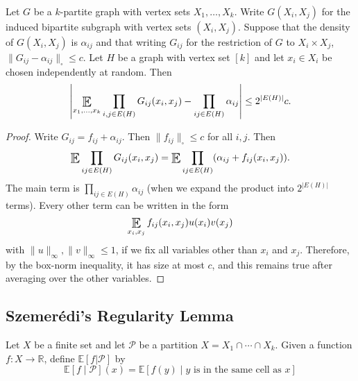 \documentclass{article}
\DeclareMathOperator*{\E}{\scalerel*{\mathbb{E}}{\textstyle\sum}}
\newcommand{\1}[1]{\mathbbm{1}_{#1}}
\begin{document}
\begin{nlemma}\label{lem:3.7}
  Let $G$ be a $k$-partite graph with vertex sets $X_1, \dotsc, X_k$.
  Write $G(X_i, X_j)$ for the induced bipartite subgraph with vertex sets $(X_i, X_j)$.
  Suppose that the density of $G(X_i, X_j)$ is $\alpha_{ij}$ and that writing $G_{ij}$ for the restriction of $G$ to $X_i \times X_j$, $\|G_{ij} - \alpha_{ij}\|_\square \leq c$.
  Let $H$ be a graph with vertex set $[k]$ and let $x_i \in X_i$ be chosen independently at random.
  Then
  \begin{equation*}
    \left\lvert\E_{x_1, \dotsc, x_k} \prod_{i,j \in E(H)} G_{ij}(x_i,x_j) - \prod_{ij \in E(H)} \alpha_{ij}\right\rvert \leq 2^{|E(H)|} c.
  \end{equation*}
\end{nlemma}
\begin{proof}
  Write $G_{ij} = f_{ij} + \alpha_{ij}$. Then $\|f_{ij}\|_\square \leq c$ for all $i,j$.
  Then
  \begin{equation*}
    \E \prod_{ij \in E(H)} G_{ij}(x_i,x_j) = \E \prod_{ij \in E(H)} (\alpha_{ij} + f_{ij}(x_i,x_j)).
  \end{equation*}
  The main term is $\prod_{ij \in E(H)} \alpha_{ij}$ (when we expand the product into $2^{|E(H)|}$ terms).
  Every other term can be written in the form
  \begin{equation*}
    \E_{x_i,x_j} f_{ij} (x_i,x_j) u(x_i) v(x_j)
  \end{equation*}
  with $\|u\|_\infty, \|v\|_\infty \leq 1$, if we fix all variables other than $x_i$ and $x_j$.
  Therefore, by the box-norm inequality, it has size at most $c$, and this remains true after averaging over the other variables.
\end{proof}

\subsection{Szemer\'edi's Regularity Lemma}
Let $X$ be a finite set and let $\mathcal{P}$ be a partition $X = X_1 \cap \dotsb \cap X_k$.
Given a function $f: X \to \mathbb{R}$, define $\mathbb{E}[f | \mathcal{P}]$ by
\begin{equation*}
  \mathbb{E}[f \mid \mathcal{P}](x) = \mathbb{E}[f(y) \mid y\text{ is in the same cell as }x]
\end{equation*}
\end{document}
